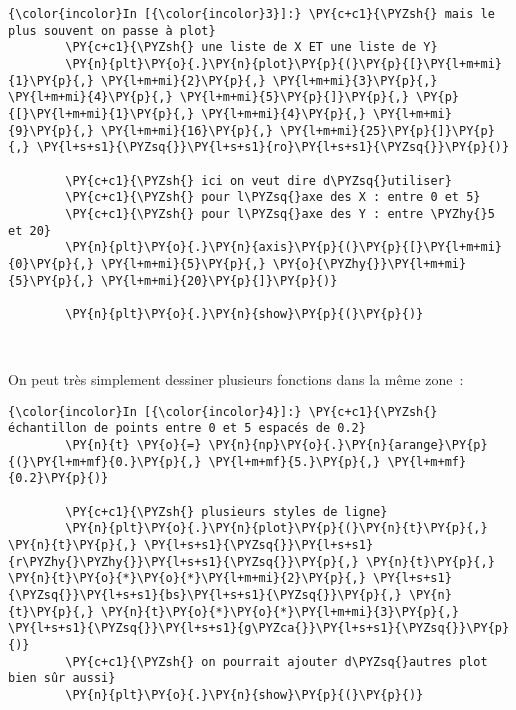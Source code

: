     \begin{Verbatim}[commandchars=\\\{\},frame=single,framerule=0.3mm,rulecolor=\color{cellframecolor}]
{\color{incolor}In [{\color{incolor}3}]:} \PY{c+c1}{\PYZsh{} mais le plus souvent on passe à plot}
        \PY{c+c1}{\PYZsh{} une liste de X ET une liste de Y}
        \PY{n}{plt}\PY{o}{.}\PY{n}{plot}\PY{p}{(}\PY{p}{[}\PY{l+m+mi}{1}\PY{p}{,} \PY{l+m+mi}{2}\PY{p}{,} \PY{l+m+mi}{3}\PY{p}{,} \PY{l+m+mi}{4}\PY{p}{,} \PY{l+m+mi}{5}\PY{p}{]}\PY{p}{,} \PY{p}{[}\PY{l+m+mi}{1}\PY{p}{,} \PY{l+m+mi}{4}\PY{p}{,} \PY{l+m+mi}{9}\PY{p}{,} \PY{l+m+mi}{16}\PY{p}{,} \PY{l+m+mi}{25}\PY{p}{]}\PY{p}{,} \PY{l+s+s1}{\PYZsq{}}\PY{l+s+s1}{ro}\PY{l+s+s1}{\PYZsq{}}\PY{p}{)}
        
        \PY{c+c1}{\PYZsh{} ici on veut dire d\PYZsq{}utiliser}
        \PY{c+c1}{\PYZsh{} pour l\PYZsq{}axe des X : entre 0 et 5}
        \PY{c+c1}{\PYZsh{} pour l\PYZsq{}axe des Y : entre \PYZhy{}5 et 20}
        \PY{n}{plt}\PY{o}{.}\PY{n}{axis}\PY{p}{(}\PY{p}{[}\PY{l+m+mi}{0}\PY{p}{,} \PY{l+m+mi}{5}\PY{p}{,} \PY{o}{\PYZhy{}}\PY{l+m+mi}{5}\PY{p}{,} \PY{l+m+mi}{20}\PY{p}{]}\PY{p}{)}
        
        \PY{n}{plt}\PY{o}{.}\PY{n}{show}\PY{p}{(}\PY{p}{)}
\end{Verbatim}


    \begin{center}
    \end{center}
    { \hspace*{\fill} \\}
    
    On peut très simplement dessiner plusieurs fonctions dans la même zone~:

    \begin{Verbatim}[commandchars=\\\{\},frame=single,framerule=0.3mm,rulecolor=\color{cellframecolor}]
{\color{incolor}In [{\color{incolor}4}]:} \PY{c+c1}{\PYZsh{} échantillon de points entre 0 et 5 espacés de 0.2}
        \PY{n}{t} \PY{o}{=} \PY{n}{np}\PY{o}{.}\PY{n}{arange}\PY{p}{(}\PY{l+m+mf}{0.}\PY{p}{,} \PY{l+m+mf}{5.}\PY{p}{,} \PY{l+m+mf}{0.2}\PY{p}{)}
        
        \PY{c+c1}{\PYZsh{} plusieurs styles de ligne}
        \PY{n}{plt}\PY{o}{.}\PY{n}{plot}\PY{p}{(}\PY{n}{t}\PY{p}{,} \PY{n}{t}\PY{p}{,} \PY{l+s+s1}{\PYZsq{}}\PY{l+s+s1}{r\PYZhy{}\PYZhy{}}\PY{l+s+s1}{\PYZsq{}}\PY{p}{,} \PY{n}{t}\PY{p}{,} \PY{n}{t}\PY{o}{*}\PY{o}{*}\PY{l+m+mi}{2}\PY{p}{,} \PY{l+s+s1}{\PYZsq{}}\PY{l+s+s1}{bs}\PY{l+s+s1}{\PYZsq{}}\PY{p}{,} \PY{n}{t}\PY{p}{,} \PY{n}{t}\PY{o}{*}\PY{o}{*}\PY{l+m+mi}{3}\PY{p}{,} \PY{l+s+s1}{\PYZsq{}}\PY{l+s+s1}{g\PYZca{}}\PY{l+s+s1}{\PYZsq{}}\PY{p}{)}
        \PY{c+c1}{\PYZsh{} on pourrait ajouter d\PYZsq{}autres plot bien sûr aussi}
        \PY{n}{plt}\PY{o}{.}\PY{n}{show}\PY{p}{(}\PY{p}{)}
\end{Verbatim}


